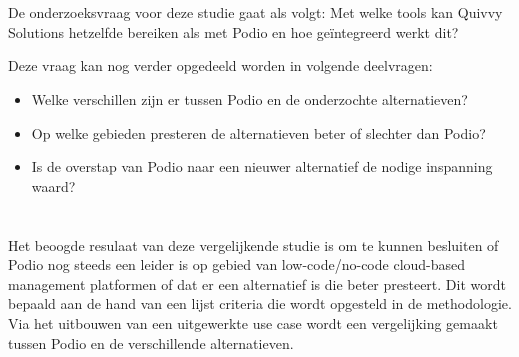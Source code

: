 \section{}%
\label{sec:onderzoeksvraag} %


De onderzoeksvraag voor deze studie gaat als volgt: Met welke tools kan Quivvy Solutions hetzelfde bereiken als met Podio en hoe geïntegreerd werkt dit?

Deze vraag kan nog verder opgedeeld worden in volgende deelvragen:
\begin{itemize}
    \item Welke verschillen zijn er tussen Podio en de onderzochte alternatieven?
    \item Op welke gebieden presteren de alternatieven beter of slechter dan Podio?
    \item Is de overstap van Podio naar een nieuwer alternatief de nodige inspanning waard?
\end{itemize}

\section{}%
\label{sec:onderzoeksdoelstelling} %

Het beoogde resulaat van deze vergelijkende studie is om te kunnen besluiten of Podio nog steeds een leider is op gebied van low-code/no-code cloud-based management platformen of dat er een alternatief is die beter presteert. Dit wordt bepaald aan de hand van een lijst criteria die wordt opgesteld in de methodologie. Via het uitbouwen van een uitgewerkte use case wordt een vergelijking gemaakt tussen Podio en de verschillende alternatieven.

